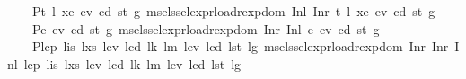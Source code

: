 \begin{isabellebody}
\ \ \ \ {\isacharquery}{\kern0pt}P{}{\isachardot}{\kern0pt}{}{\isacharequal}{\kern0pt}{\isachardoublequoteopen}{\isasymlambda}t{}\ l{}\ xe{}\ ev{}\ cd{}\ st{}\ g{}{\isachardot}{\kern0pt}\ msel{\isacharunderscore}{\kern0pt}ssel{\isacharunderscore}{\kern0pt}expr{\isacharunderscore}{\kern0pt}load{\isacharunderscore}{\kern0pt}rexp{\isacharunderscore}{\kern0pt}dom\ {\isacharparenleft}{\kern0pt}Inl\ {\isacharparenleft}{\kern0pt}Inr\ {\isacharparenleft}{\kern0pt}t{}{\isacharcomma}{\kern0pt}\ l{}{\isacharcomma}{\kern0pt}\ xe{}{\isacharcomma}{\kern0pt}\ ev{}{\isacharcomma}{\kern0pt}\ cd{}{\isacharcomma}{\kern0pt}\ st{}{\isacharcomma}{\kern0pt}\ g{}{\isacharparenright}{\kern0pt}{\isacharparenright}{\kern0pt}{\isacharparenright}{\kern0pt}{\isachardoublequoteclose}\isanewline
\ \ \ \ {\isacharquery}{\kern0pt}P{}{\isachardot}{\kern0pt}{}{\isacharequal}{\kern0pt}{\isachardoublequoteopen}{\isasymlambda}e{}\ ev{}\ cd{}\ st{}\ g{}{\isachardot}{\kern0pt}\ msel{\isacharunderscore}{\kern0pt}ssel{\isacharunderscore}{\kern0pt}expr{\isacharunderscore}{\kern0pt}load{\isacharunderscore}{\kern0pt}rexp{\isacharunderscore}{\kern0pt}dom\ {\isacharparenleft}{\kern0pt}Inr\ {\isacharparenleft}{\kern0pt}Inl\ {\isacharparenleft}{\kern0pt}e{}{\isacharcomma}{\kern0pt}\ ev{}{\isacharcomma}{\kern0pt}\ cd{}{\isacharcomma}{\kern0pt}\ st{}{\isacharcomma}{\kern0pt}\ g{}{\isacharparenright}{\kern0pt}{\isacharparenright}{\kern0pt}{\isacharparenright}{\kern0pt}{\isachardoublequoteclose}\isanewline
\ \ \ \ {\isacharquery}{\kern0pt}P{}{\isachardot}{\kern0pt}{}{\isacharequal}{\kern0pt}{\isachardoublequoteopen}{\isasymlambda}lcp\ lis\ lxs\ lev{}\ lcd{}\ lk\ lm\ lev\ lcd\ lst\ lg{\isachardot}{\kern0pt}\ msel{\isacharunderscore}{\kern0pt}ssel{\isacharunderscore}{\kern0pt}expr{\isacharunderscore}{\kern0pt}load{\isacharunderscore}{\kern0pt}rexp{\isacharunderscore}{\kern0pt}dom\ {\isacharparenleft}{\kern0pt}Inr\ {\isacharparenleft}{\kern0pt}Inr\ {\isacharparenleft}{\kern0pt}Inl\ {\isacharparenleft}{\kern0pt}lcp{\isacharcomma}{\kern0pt}\ lis{\isacharcomma}{\kern0pt}\ lxs{\isacharcomma}{\kern0pt}\ lev{}{\isacharcomma}{\kern0pt}\ lcd{}{\isacharcomma}{\kern0pt}\ lk{\isacharcomma}{\kern0pt}\ lm{\isacharcomma}{\kern0pt}\ lev{\isacharcomma}{\kern0pt}\ lcd{\isacharcomma}{\kern0pt}\ lst{\isacharcomma}{\kern0pt}\ lg{\isacharparenright}{\kern0pt}{\isacharparenright}{\kern0pt}{\isacharparenright}{\kern0pt}{\isacharparenright}{\kern0pt}{\isachardoublequoteclose}\isanewline

\end{isabellebody}
